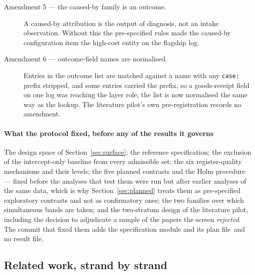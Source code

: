 \begin{description}
\item[Amendment 5 --- the caused-by family is an outcome.]
A caused-by attribution is the output of diagnosis, not an intake observation.
Without this the pre-specified rules made the caused-by configuration item the
high-cost entity on the flagship log.

\item[Amendment 6 --- outcome-field names are normalised.]
Entries in the outcome list are matched against a name with any
\texttt{case:} prefix stripped, and some entries carried the prefix, so a
goods-receipt field on one log was reaching the layer role; the list is now
normalised the same way as the lookup. The literature pilot's own
pre-registration records no amendment.
\end{description}

\paragraph{What the protocol fixed, before any of the results it governs}
The design space of Section~\ref{sec:surface}; the reference specification;
the exclusion of the intercept-only baseline from every admissible set; the six
register-quality mechanisms and their levels; the five planned contrasts and
the Holm procedure --- fixed before the analyses that test them were run but
after earlier analyses of the same data, which is why
Section~\ref{sec:planned} treats them as pre-specified exploratory contrasts
and not as confirmatory ones; the two families over which simultaneous bands
are taken; and the two-stratum design of the literature pilot, including the
decision to adjudicate a sample of the papers the screen \emph{rejected}. The
commit that fixed them adds \ifblind the specification module and its plan
file\else\specfixcommit\fi\ and no result file.

\subsection{Related work, strand by strand}
\label{app:related}

